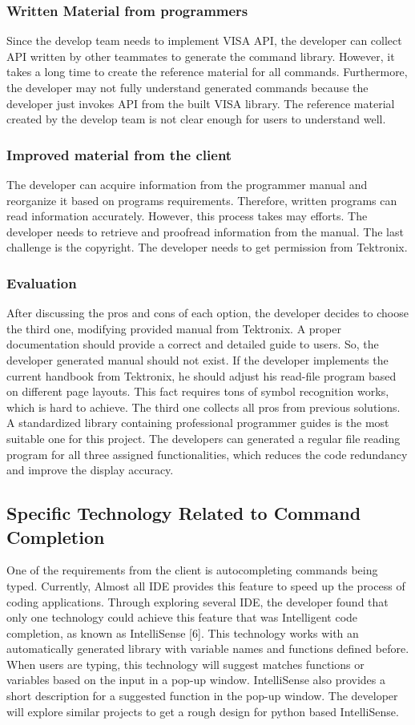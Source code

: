 \documentclass [10pt]{article}
\begin{document}
\subsubsection{Written Material from programmers}
Since the develop team needs to implement VISA API, the developer can collect API written by other teammates to generate the command library. However, it takes a long time to create the reference material for all commands. Furthermore, the developer may not fully understand generated commands because the developer just invokes API from the built VISA library. The reference material created by the develop team is not clear enough for users to understand well.    
\subsubsection{Improved material from the client}
The developer can acquire information from the programmer manual and reorganize it based on programs requirements. Therefore, written programs can read information accurately. However, this process takes may efforts. The developer needs to retrieve and proofread information from the manual. The last challenge is the copyright. The developer needs to get permission from Tektronix.   
\subsubsection{Evaluation}
After discussing the pros and cons of each option, the developer decides to choose the third one, modifying provided manual from Tektronix. A proper documentation should provide a correct and detailed guide to users. So, the developer generated manual should not exist. If the developer implements the current handbook from Tektronix, he should adjust his read-file program based on different page layouts. This fact requires tons of symbol recognition works, which is hard to achieve. The third one collects all pros from previous solutions. A standardized library containing professional programmer guides is the most suitable one for this project. The developers can generated a regular file reading program for all three assigned functionalities, which reduces the code redundancy and improve the display accuracy. 


\subsection{Specific Technology Related to Command Completion}
One of the requirements from the client is autocompleting commands being typed. Currently, Almost all IDE provides this feature to speed up the process of coding applications. Through exploring several IDE, the developer found that only one technology could achieve this feature that was Intelligent code completion, as known as IntelliSense [6]. This technology works with an automatically generated library with variable names and functions defined before. When users are typing, this technology will suggest matches functions or variables based on the input in a pop-up window. IntelliSense also provides a short description for a suggested function in the pop-up window. The developer will explore similar projects to get a rough design for python based IntelliSense.
\end{document}
